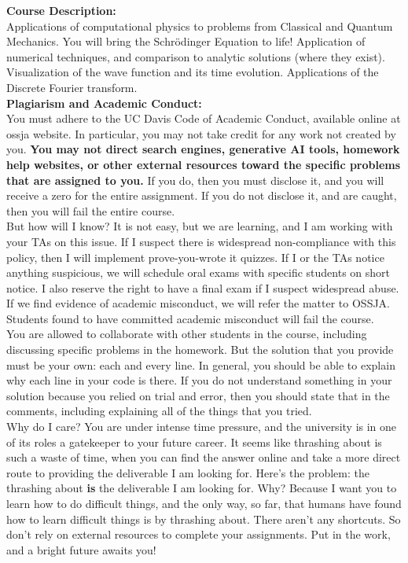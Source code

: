 \documentclass[12pt]{article}
\begin{document}
\noindent
\textbf {Course Description:}\\
Applications of computational physics to problems from Classical and
Quantum Mechanics.  You will bring the Schr\"odinger Equation to life!
Application of numerical techniques, and comparison to analytic
solutions (where they exist).  Visualization of the wave function and
its time evolution.  Applications of the Discrete Fourier
transform.\\[8pt]

\noindent
\textbf {Plagiarism and Academic Conduct:}\\
You must adhere to the UC Davis Code of Academic Conduct, available
online at ossja website. In particular, you may not take credit for
any work not created by you.  {\bf You may not direct search engines,
  generative AI tools, homework help websites, or other external
  resources toward the specific problems that are assigned to you.}
If you do, then you must disclose it, and you will receive a zero for
the entire assignment.  If you do not disclose it, and are caught,
then you will fail the entire course.\\[3pt]

\noindent
But how will I know?  It is not easy, but we are learning, and I am
working with your TAs on this issue.  If I suspect there is widespread
non-compliance with this policy, then I will implement prove-you-wrote
it quizzes.  If I or the TAs notice anything suspicious, we will
schedule oral exams with specific students on short notice.  I also
reserve the right to have a final exam if I suspect widespread abuse.
If we find evidence of academic misconduct, we will refer the matter
to OSSJA.  Students found to have committed academic misconduct will
fail the course.\\[3pt]

\noindent
You are allowed to collaborate with other students in the course,
including discussing specific problems in the homework.  But the
solution that you provide must be your own:  each and every line.
In general, you should be able to explain why each line in your code
is there.  If you do not understand something in your solution because
you relied on trial and error, then you should state that in the
comments, including explaining all of the things that you tried.\\[3pt]

\noindent
Why do I care?  You are under intense time pressure, and the
university is in one of its roles a gatekeeper to your future career.
It seems like thrashing about is such a waste of time, when you can
find the answer online and take a more direct route to providing the
deliverable I am looking for.  Here's the problem: the thrashing about
{\bf is} the deliverable I am looking for.  Why?  Because I want you
to learn how to do difficult things, and the only way, so far, that
humans have found how to learn difficult things is by thrashing about.
There aren't any shortcuts.  So don't rely on external resources to
complete your assignments.  Put in the work, and a bright future
awaits you!\\[3pt]
\end{document}
